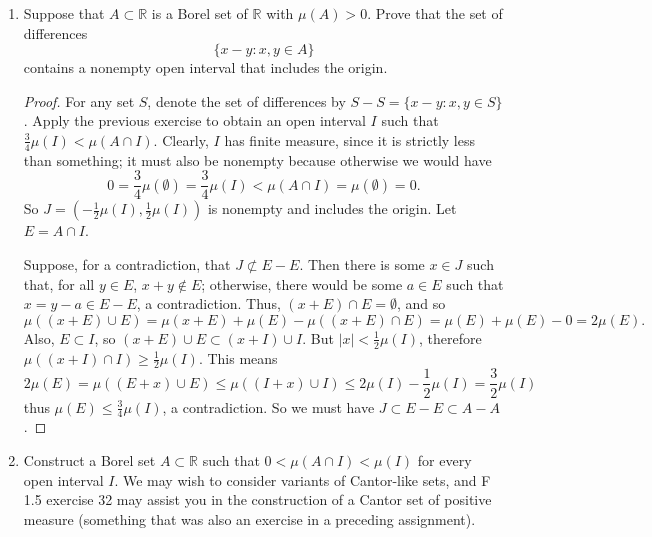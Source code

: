 \documentclass[10pt]{article}
\newcommand{\Z}{\mathbb{Z}}
\newcommand{\R}{\mathbb{R}}
\begin{document}
\begin{enumerate}
\begin{proof}
Finally, consider the case where $m(E) = \infty$.  There must be some open interval $J = (j,j+2)$ for $j \in \Z$ such that $E \cap J$ has finite, positive measure.  Otherwise, $m(E) = m(\bigcup_1^\infty E \cap (i,i+2)) \leq \sum_1^\infty m(E \cap (i,i+2)) = \sum_1^\infty 0 = 0$, a contradiction.  We can apply the finite case of the proposition, which we have just proven, to the set $E \cap J$ to obtain an open interval $I$ such that $$m(E \cap (I \cap J)) = m((E \cap J) \cap I) > \alpha m(I) \geq \alpha m(I \cap J).$$
Therefore, $I \cap J$ is the interval we seek (it is an intersection of open intervals, thus is an open interval).

\end{proof}

\item Suppose that $A \subset \R$ is a Borel set of $\R$ with $\mu(A) > 0$.  Prove that the set of differences
$$
\{x - y : x,y \in A \}
$$
contains a nonempty open interval that includes the origin.

\begin{proof}
For any set $S$, denote the set of differences by $S - S = \{x - y : x,y \in S \}$.
Apply the previous exercise to obtain an open interval $I$ such that $\frac{3}{4}\mu(I) < \mu(A \cap I)$.  Clearly, $I$ has finite measure, since it is strictly less than something; it must also be nonempty because otherwise we would have
$$
0 = \frac{3}{4}\mu(\emptyset) = \frac34 \mu(I) < \mu(A \cap I) = \mu(\emptyset) = 0.
$$
So $J = (-\frac12 \mu(I), \frac12 \mu(I))$ is nonempty and includes the origin.  Let $E = A \cap I$.

Suppose, for a contradiction, that $J \not \subset E - E$.  Then there is some $x \in J$ such that, for all $y \in E$, $x+y \not \in E$; otherwise, there would be some $a \in E$ such that $x = y-a \in E - E$, a contradiction.  Thus, $(x+E) \cap E = \emptyset$, and so $$\mu((x+E) \cup E) = \mu(x+E) + \mu(E) - \mu((x+E) \cap E) = \mu(E) + \mu(E) - 0 = 2\mu(E).$$
Also, $E \subset I$, so $(x+E) \cup E \subset (x + I) \cup I$.  But $|x| < \frac12 \mu(I)$, therefore $\mu((x + I) \cap I) \geq \frac12 \mu(I)$.  This means
$$
2 \mu(E) = \mu((E + x) \cup E) \leq \mu((I+x) \cup I) \leq 2\mu(I) - \frac12 \mu(I) = \frac32 \mu(I)
$$
thus $\mu(E) \leq \frac34 \mu(I)$, a contradiction.  So we must have $J \subset E - E \subset A - A$.
\end{proof}


\item Construct a Borel set $A \subset \R$ such that $0 < \mu(A \cap I) < \mu(I)$ for every open interval $I$.  We may wish to consider variants of Cantor-like sets, and F 1.5 exercise 32 may assist you in the construction of a Cantor set of positive measure (something that was also an exercise in a preceding assignment).


\end{enumerate}
\end{document}
